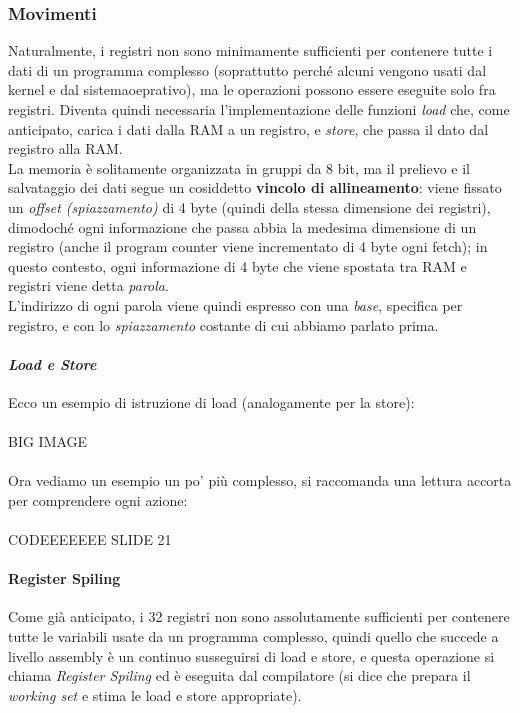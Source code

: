 \documentclass[class=book, crop=false]{standalone}
\begin{document}
\subsubsection{Movimenti}Naturalmente, i registri non sono minimamente sufficienti per contenere tutte i dati di un programma complesso (soprattutto perché alcuni vengono usati dal kernel e dal sistemaoeprativo), ma le operazioni possono essere eseguite solo fra registri. Diventa quindi necessaria l'implementazione delle funzioni \emph{load} che, come anticipato, carica i dati dalla RAM a un registro, e \emph{store}, che passa il dato dal registro alla RAM.\\
La memoria è solitamente organizzata in gruppi da 8 bit, ma il prelievo e il salvataggio dei dati segue un cosiddetto \textbf{vincolo di allineamento}: viene fissato un \textit{offset (spiazzamento)} di 4 byte (quindi della stessa dimensione dei registri), dimodoché ogni informazione che passa abbia la medesima dimensione di un registro (anche il program counter viene incrementato di 4 byte ogni fetch); in questo contesto, ogni informazione di 4 byte che viene spostata tra RAM e registri viene detta \emph{parola}.\\
L'indirizzo di ogni parola viene quindi espresso con una \textit{base}, specifica per registro, e con lo \textit{spiazzamento} costante di cui abbiamo parlato prima.
\paragraph{\textit{Load e Store}}
Ecco un esempio di istruzione di load (analogamente per la store):\\\\
BIG IMAGE\\\\
Ora vediamo un esempio un po' più complesso, si raccomanda una lettura accorta per comprendere ogni azione:\\\\
CODEEEEEEE SLIDE 21
\paragraph{Register Spiling}
Come già anticipato, i 32 registri non sono assolutamente sufficienti per contenere tutte le variabili usate da un programma complesso, quindi quello che succede a livello assembly è un continuo susseguirsi di load e store, e questa operazione si chiama \emph{Register Spiling} ed è eseguita dal compilatore (si dice che  prepara il \textit{working set} e stima le load e store appropriate).
\end{document}
